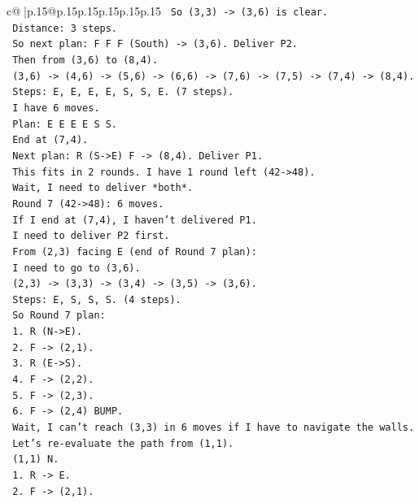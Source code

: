 \documentclass{article}
\begin{document}
{\begin{supertabular}{c@{$\;$}|p{.15\linewidth}@{}p{.15\linewidth}p{.15\linewidth}p{.15\linewidth}p{.15\linewidth}p{.15\linewidth}}
{{{\texttt{   So (3,3) {-}> (3,6) is clear.} \\
\texttt{   Distance: 3 steps.} \\
\texttt{   So next plan: F F F (South) {-}> (3,6). Deliver P2.} \\
\texttt{   Then from (3,6) to (8,4).} \\
\texttt{   (3,6) {-}> (4,6) {-}> (5,6) {-}> (6,6) {-}> (7,6) {-}> (7,5) {-}> (7,4) {-}> (8,4).} \\
\texttt{   Steps: E, E, E, E, S, S, E. (7 steps).} \\
\texttt{   I have 6 moves.} \\
\texttt{   Plan: E E E E S S.} \\
\texttt{   End at (7,4).} \\
\texttt{   Next plan: R (S{-}>E) F {-}> (8,4). Deliver P1.} \\
\texttt{   This fits in 2 rounds. I have 1 round left (42{-}>48).} \\
\texttt{   Wait, I need to deliver *both*.} \\
\texttt{   Round 7 (42{-}>48): 6 moves.} \\
\texttt{   If I end at (7,4), I haven't delivered P1.} \\
\texttt{   I need to deliver P2 first.} \\
\texttt{   From (2,3) facing E (end of Round 7 plan):} \\
\texttt{   I need to go to (3,6).} \\
\texttt{   (2,3) {-}> (3,3) {-}> (3,4) {-}> (3,5) {-}> (3,6).} \\
\texttt{   Steps: E, S, S, S. (4 steps).} \\
\texttt{   So Round 7 plan:} \\
\texttt{   1. R (N{-}>E).} \\
\texttt{   2. F {-}> (2,1).} \\
\texttt{   3. R (E{-}>S).} \\
\texttt{   4. F {-}> (2,2).} \\
\texttt{   5. F {-}> (2,3).} \\
\texttt{   6. F {-}> (2,4) BUMP.} \\
\texttt{   Wait, I can't reach (3,3) in 6 moves if I have to navigate the walls.} \\
\texttt{   Let's re{-}evaluate the path from (1,1).} \\
\texttt{   (1,1) N.} \\
\texttt{   1. R {-}> E.} \\
\texttt{   2. F {-}> (2,1).} \\
}}}
\end{supertabular}}
\end{document}
